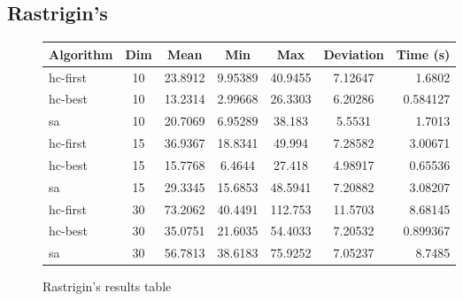 \documentclass{article}
\begin{document}
        \subsection{Rastrigin's}
        \begin{figure}[H]
            \centering
            \begin{tabular}{|l|c|c|c|c|c|r|}
                \hline Algorithm & Dim & Mean & Min & Max & Deviation & Time (s) \\
                \hline hc-first & 10 & 23.8912 & 9.95389 & 40.9455 & 7.12647 & 1.6802 \\
                \hline hc-best & 10 & 13.2314 & 2.99668 & 26.3303 & 6.20286 & 0.584127 \\
                \hline sa & 10 & 20.7069 & 6.95289 & 38.183 & 5.5531 & 1.7013 \\
                \hline hc-first & 15 & 36.9367 & 18.8341 & 49.994 & 7.28582 & 3.00671 \\
                \hline hc-best & 15 & 15.7768 & 6.4644 & 27.418 & 4.98917 & 0.65536 \\
                \hline sa & 15 & 29.3345 & 15.6853 & 48.5941 & 7.20882 & 3.08207 \\
                \hline hc-first & 30 & 73.2062 & 40.4491 & 112.753 & 11.5703 & 8.68145 \\
                \hline hc-best & 30 & 35.0751 & 21.6035 & 54.4033 & 7.20532 & 0.899367 \\
                \hline sa & 30 & 56.7813 & 38.6183 & 75.9252 & 7.05237 & 8.7485 \\
                \hline
            \end{tabular}
            \caption{Rastrigin's results table}
        \end{figure}
\end{document}
